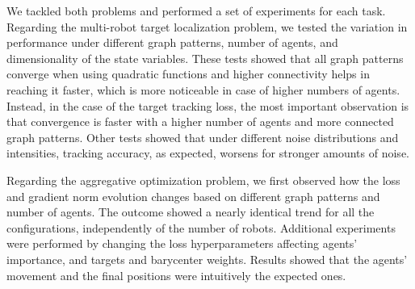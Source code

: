 \documentclass[a4paper,11pt,oneside]{book}
\begin{document}
We tackled both problems and performed a set of experiments for each task. Regarding the multi-robot target localization problem, we tested the variation in performance under different graph patterns, number of agents, and dimensionality of the state variables. These tests showed that all graph patterns converge when using quadratic functions and higher connectivity helps in reaching it faster, which is more noticeable in case of higher numbers of agents. Instead, in the case of the target tracking loss, the most important observation is that convergence is faster with a higher number of agents and more connected graph patterns. Other tests showed that under different noise distributions and intensities, tracking accuracy, as expected, worsens for stronger amounts of noise.

Regarding the aggregative optimization problem, we first observed how the loss and gradient norm evolution changes based on different graph patterns and number of agents. The outcome showed a nearly identical trend for all the configurations, independently of the number of robots. Additional experiments were performed by changing the loss hyperparameters affecting agents' importance, and targets and barycenter weights. Results showed that the agents' movement and the final positions were intuitively the expected ones.



\end{document}
